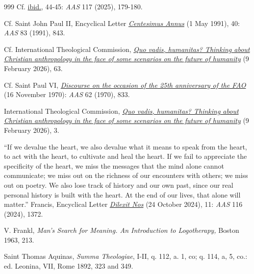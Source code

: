 \documentclass{article}
\begin{document}
\begin{thebibliography}{999}
 Cf. \href{https://www.vatican.va/roman_curia/congregations/cfaith/documents/rc_ddf_doc_20250128_antiqua-et-nova_en.html}{ibid.}, 44-45: \emph{AAS} 117 (2025), 179-180.

 Cf. Saint John Paul II, Encyclical Letter \href{https://www.vatican.va/content/john-paul-ii/en/encyclicals/documents/hf_jp-ii_enc_01051991_centesimus-annus.html}{\emph{Centesimus Annus}} (1 May 1991), 40: \emph{AAS} 83 (1991), 843.

 Cf. International Theological Commission, \href{https://www.vatican.va/roman_curia/congregations/cfaith/cti_documents/rc_cti_doc_20260304_quo-vadis-humanits_en.html}{\emph{Quo vadis, humanitas? Thinking about Christian anthropology in the face of some scenarios on the future of humanity}} (9 February 2026), 63.

 Cf. Saint Paul VI, \href{https://www.vatican.va/content/paul-vi/en/speeches/1970/documents/hf_p-vi_spe_19701116_xxv-istituzione-fao.html}{\emph{Discourse on the occasion of the 25th anniversary of the FAO}} (16 November 1970): \emph{AAS} 62 (1970), 833.

 International Theological Commission, \href{https://www.vatican.va/roman_curia/congregations/cfaith/cti_documents/rc_cti_doc_20260304_quo-vadis-humanits_en.html}{\emph{Quo vadis, humanitas? Thinking about Christian anthropology in the face of some scenarios on the future of humanity}} (9 February 2026), 3.

 ``If we devalue the heart, we also devalue what it means to speak from the heart, to act with the heart, to cultivate and heal the heart. If we fail to appreciate the specificity of the heart, we miss the messages that the mind alone cannot communicate; we miss out on the richness of our encounters with others; we miss out on poetry. We also lose track of history and our own past, since our real personal history is built with the heart. At the end of our lives, that alone will matter.'' Francis, Encyclical Letter \href{https://www.vatican.va/content/francesco/en/encyclicals/documents/20241024-enciclica-dilexit-nos.html}{\emph{Dilexit Nos}} (24 October 2024), 11: \emph{AAS} 116 (2024), 1372.

 V. Frankl, \emph{Man's Search for Meaning. An Introduction to Logotherapy,} Boston 1963, 213.

 Saint Thomas Aquinas, \emph{Summa Theologiae}, I-II, q. 112, a. 1, co; q. 114, a, 5, co.: ed. Leonina, VII, Rome 1892, 323 and 349.


\end{thebibliography}
\end{document}
